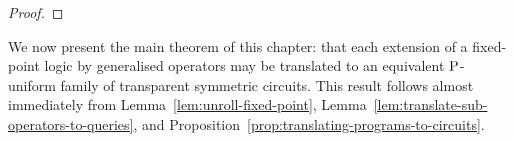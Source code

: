 \documentclass[../main/thesis.tex]{subfiles}
\begin{document}
\begin{proof}













  
\end{proof}
We now present the main theorem of this chapter: that each extension of a
fixed-point logic by generalised operators may be translated to an equivalent
$\mathrm{P}$-uniform family of transparent symmetric circuits. This result follows
almost immediately from Lemma~\ref{lem:unroll-fixed-point},
Lemma~\ref{lem:translate-sub-operators-to-queries}, and
Proposition~\ref{prop:translating-programs-to-circuits}.
\end{document}

